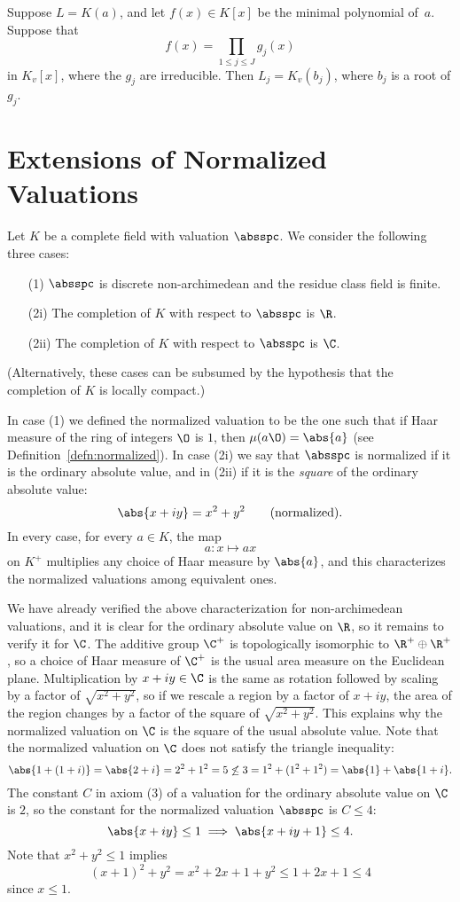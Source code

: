 \begin{corollary}
Suppose $L=K(a)$, and let $f(x)\in K[x]$ be the minimal polynomial of~$a$. 
Suppose that 
$$
f(x) = \prod_{1\leq j\leq J} g_j(x)
$$
in $K_v[x]$, where the $g_j$ are irreducible.  Then $L_j = K_v(b_j)$, where
$b_j$ is a root of $g_j$.
\end{corollary}

\section{Extensions of Normalized Valuations}
Let $K$ be a complete field with valuation $\absspc$.  
We consider the following three cases:
\begin{itemize}
\item[(1)] $\absspc$ is discrete non-archimedean and the 
residue class field is finite.
\item[(2i)] The completion of $K$ with respect to $\absspc$ is $\R$.
\item[(2ii)] The completion of $K$ with respect to $\absspc$ is $\C$.
\end{itemize}
(Alternatively, these cases can be subsumed by the hypothesis that
the completion of $K$ is locally compact.)

In case (1) we defined the normalized valuation to 
be the one such that if Haar measure of the ring of integers $\O$ is $1$,
then $\mu(a\O) = \abs{a}$ (see Definition~\ref{defn:normalized}).
In case (2i) we say that $\absspc$ is normalized if it is the ordinary
absolute value, and in (2ii) if it is the {\em square} of the ordinary
absolute value:
$$\abs{x+iy} = x^2 + y^2 \qquad \text{(normalized)}.$$
In every case, for every $a\in K$,  the map 
$$
   a: x \mapsto a x
$$
on $K^+$ multiplies any choice of Haar measure by $\abs{a}$, and this characterizes
the normalized valuations among equivalent ones. 

We have already verified the above characterization for
non-archimedean valuations, and it is clear for the ordinary absolute
value on $\R$, so it remains to verify it for $\C$.  The additive
group $\C^+$ is topologically isomorphic to $\R^+ \oplus \R^+$, so a
choice of Haar measure of $\C^+$ is the usual area measure on the
Euclidean plane.  Multiplication by $x+iy\in \C$ is the same as
rotation followed by scaling by a factor of $\sqrt{x^2+y^2}$, so if we
rescale a region by a factor of $x+iy$, the area of the region changes
by a factor of the square of $\sqrt{x^2+y^2}$. This explains why the
normalized valuation on $\C$ is the square of the usual absolute
value.  Note that the normalized valuation on $\C$ does not satisfy
the triangle inequality:
$$
\abs{1 + (1+i)} = \abs{2+i} = 2^2 + 1^2 = 5 \not\leq 
 3= 1^2 + (1^2 + 1^2) =  \abs{1} + \abs{1+i}.
$$
The constant $C$ in axiom (3) of a valuation for the ordinary
absolute value on $\C$ is $2$, so the constant for the normalized
valuation $\absspc$ is $C\leq 4$:
$$
 \abs{x+iy} \leq 1 \implies \abs{x+iy+1} \leq 4.
$$
Note that $x^2 +y^2 \leq 1$ implies $$(x+1)^2 + y^2 
 = x^2 + 2x + 1 + y^2 \leq 1 + 2x + 1 \leq 4$$ since
$x\leq 1$.

